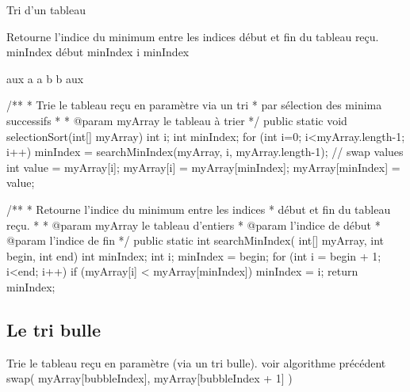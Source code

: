 \begin{Fiche}{Tri d’un tableau}
\begin{pseudocode}
		\Empty
		\LComment Retourne l’indice du minimum entre les indices début 
		et fin du tableau reçu.
			\Let minIndex \Gets début
					\Let minIndex \Gets i
				\EndIf
			\EndFor
			\Return minIndex
		\EndAlgo

		\Empty
			\Let aux \Gets a
			\Let a \Gets b
			\Let b \Gets aux
		\EndAlgo
	\end{pseudocode}

	\begin{java}
/**
 * Trie le tableau reçu en paramètre via un tri
 * par sélection des minima successifs
 *
 * @param myArray le tableau à trier
 */
public static void selectionSort(int[] myArray){
	int i;
	int minIndex;
	for (int i=0; i<myArray.length-1; i++){
		minIndex = searchMinIndex(myArray, i, myArray.length-1);
		// swap values
		int value = myArray[i];
		myArray[i] = myArray[minIndex];
		myArray[minIndex] = value;
	}
}

/**
 * Retourne l'indice du minimum entre les indices
 * début et fin du tableau reçu.
 * 
 * @param myArray le tableau d'entiers
 * @param l'indice de début
 * @param l'indice de fin
 */
public static int searchMinIndex(
		int[] myArray,
		int begin,
		int end){
	int minIndex;
	int i;
	minIndex = begin;
	for (int i = begin + 1; i<end; i++){
		if (myArray[i] < myArray[minIndex]) {
			minIndex = i;
		}
	}
	return minIndex;	
}
	\end{java}



	

\subsection*{Le tri bulle}

	\begin{pseudocode}
	\LComment Trie le tableau reçu en paramètre (via un tri bulle).
                                        	\LComment voir algorithme précédent
						\Stmt swap( myArray[bubbleIndex], myArray[bubbleIndex + 1] )
					\EndIf
				\EndFor
			\EndFor
		\EndAlgo
	\end{pseudocode}


\end{Fiche}
